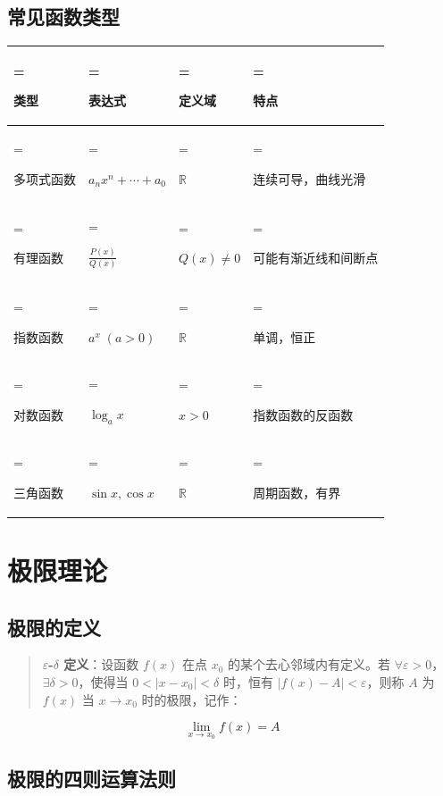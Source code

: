 \documentclass{harryopo-mathnotes}
\begin{document}
\subsection{常见函数类型}\label{ux5e38ux89c1ux51fdux6570ux7c7bux578b}

\begin{table}[htbp]
\centering
\begin{tabularx}{\textwidth}{>{\hsize=0.702\hsize\linewidth=\hsize\raggedright\arraybackslash}X>{\hsize=1.193\hsize\linewidth=\hsize\raggedright\arraybackslash}X>{\hsize=0.702\hsize\linewidth=\hsize\raggedright\arraybackslash}X>{\hsize=1.404\hsize\linewidth=\hsize\raggedright\arraybackslash}X}
\toprule
\textbf{类型} & \textbf{表达式} & \textbf{定义域} & \textbf{特点} \\
\midrule
多项式函数 & \(a_n x^n + \cdots + a_0\) & \(\mathbb{R}\) & 连续可导，曲线光滑 \\
有理函数 & \(\frac{P(x)}{Q(x)}\) & \(Q(x) \neq 0\) & 可能有渐近线和间断点 \\
指数函数 & \(a^x \; (a > 0)\) & \(\mathbb{R}\) & 单调，恒正 \\
对数函数 & \(\log_a x\) & \(x > 0\) & 指数函数的反函数 \\
三角函数 & \(\sin x, \cos x\) & \(\mathbb{R}\) & 周期函数，有界 \\
\bottomrule
\end{tabularx}
\end{table}

\section{极限理论}\label{ux6781ux9650ux7406ux8bba}

\subsection{极限的定义}\label{ux6781ux9650ux7684ux5b9aux4e49}

\begin{quote}
\textbf{\(\varepsilon\)-\(\delta\) 定义}：设函数 \(f(x)\) 在点 \(x_0\)
的某个去心邻域内有定义。若
\(\forall \varepsilon > 0\)，\(\exists \delta > 0\)，使得当
\(0 < |x - x_0| < \delta\) 时，恒有 \(|f(x) - A| < \varepsilon\)，则称
\(A\) 为 \(f(x)\) 当 \(x \to x_0\) 时的极限，记作：
\end{quote}

\[\lim_{x \to x_0} f(x) = A\]

\subsection{极限的四则运算法则}\label{ux6781ux9650ux7684ux56dbux5219ux8fd0ux7b97ux6cd5ux5219}
\end{document}
